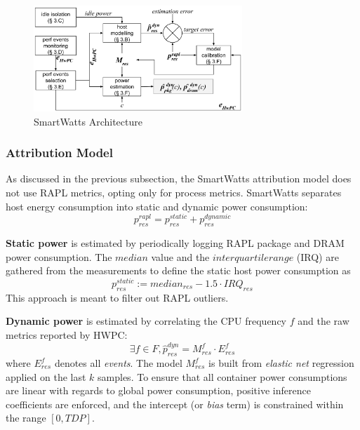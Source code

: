 \begin{figure}[ht]
    \centering
    \includegraphics[width=0.7\textwidth]{Figures/smartwatts_architecture.png}
    \caption[SmartWatts architecture]{SmartWatts Architecture}
    \label{fig:smartwatts_architecture}
\end{figure}

\subsubsection{Attribution Model}
\label{sec:smartwatts-attribution}
As discussed in the previous subsection, the SmartWatts attribution model does not use RAPL metrics, opting only for process metrics. SmartWatts separates host energy consumption into static and dynamic power consumption:
\begin{equation}
    p_{res}^{rapl} = p_{res}^{static} + p_{res}^{dynamic}
\end{equation}

\textbf{Static power} is estimated by periodically logging RAPL package and DRAM power consumption. The $median$ value and the $interquartile range$ (IRQ) are gathered from the measurements to define the static host power consumption as 
\begin{equation}
    p_{res}^{static} := median_{res} - 1.5 \cdot IRQ_{res}
\end{equation}
This approach is meant to filter out RAPL outliers.

\textbf{Dynamic power} is estimated by correlating the CPU frequency $f$ and the raw metrics reported by HWPC:
\begin{equation}
    \exists f \in F, \hat{p}_{res}^{dyn} = M_{res}^{f} \cdot E_{res}^{f}
\end{equation}
where $E_{res}^{f}$ denotes all \textit{events}. The model $M_{res}^{f}$ is built from \textit{elastic net} regression applied on the last $k$ samples. To ensure that all container power consumptions are linear with regards to global power consumption, positive inference coefficients are enforced, and the intercept (or \textit{bias} term) is constrained within the range $[0, TDP]$.

